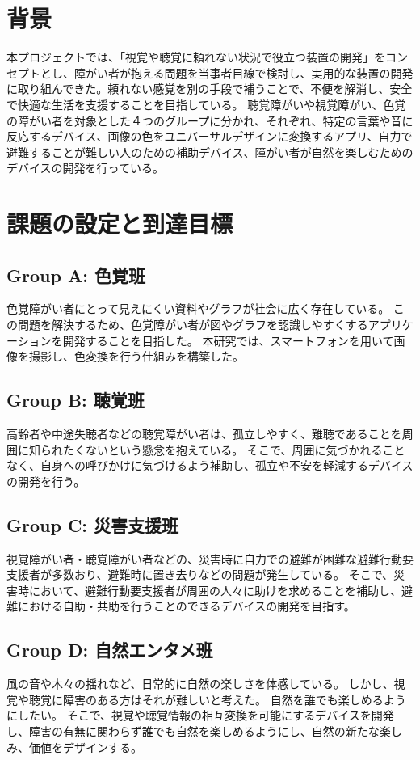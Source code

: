 \section{背景}
本プロジェクトでは、「視覚や聴覚に頼れない状況で役立つ装置の開発」をコンセプトとし、障がい者が抱える問題を当事者目線で検討し、実用的な装置の開発に取り組んできた。頼れない感覚を別の手段で補うことで、不便を解消し、安全で快適な生活を支援することを目指している。
聴覚障がいや視覚障がい、色覚の障がい者を対象とした４つのグループに分かれ、それぞれ、特定の言葉や音に反応するデバイス、画像の色をユニバーサルデザインに変換するアプリ、自力で避難することが難しい人のための補助デバイス、障がい者が自然を楽しむためのデバイスの開発を行っている。

\section{課題の設定と到達目標}
\subsection{Group A: 色覚班}
色覚障がい者にとって見えにくい資料やグラフが社会に広く存在している。
この問題を解決するため、色覚障がい者が図やグラフを認識しやすくするアプリケーションを開発することを目指した。
本研究では、スマートフォンを用いて画像を撮影し、色変換を行う仕組みを構築した。

\subsection{Group B: 聴覚班}
高齢者や中途失聴者などの聴覚障がい者は、孤立しやすく、難聴であることを周囲に知られたくないという懸念を抱えている。
そこで、周囲に気づかれることなく、自身への呼びかけに気づけるよう補助し、孤立や不安を軽減するデバイスの開発を行う。

\subsection{Group C: 災害支援班}
視覚障がい者・聴覚障がい者などの、災害時に自力での避難が困難な避難行動要支援者が多数おり、避難時に置き去りなどの問題が発生している。
そこで、災害時において、避難行動要支援者が周囲の人々に助けを求めることを補助し、避難における自助・共助を行うことのできるデバイスの開発を目指す。

\subsection{Group D: 自然エンタメ班}
風の音や木々の揺れなど、日常的に自然の楽しさを体感している。
しかし、視覚や聴覚に障害のある方はそれが難しいと考えた。
自然を誰でも楽しめるようにしたい。
そこで、視覚や聴覚情報の相互変換を可能にするデバイスを開発し、障害の有無に関わらず誰でも自然を楽しめるようにし、自然の新たな楽しみ、価値をデザインする。

